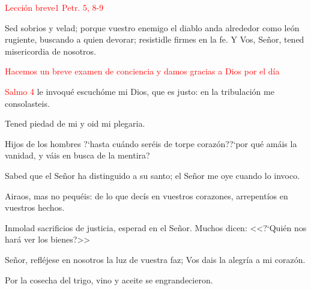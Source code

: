 \documentclass[9pt]{article}
\begin{document}
\begin{multicols}{2}
      \noindent\textcolor{red}{Lección breve}\hfill\textcolor{red}{1 Petr. 5, 8-9}
      
      Sed sobrios y velad; porque vuestro enemigo el diablo anda alrededor como león rugiente, buscando a quien devorar; resistidle firmes en la fe.
      Y Vos, Señor, tened misericordia de nosotros.

      \vspace{1mm}


      \begin{otherlanguage}{latin}
            
      \end{otherlanguage}

      \textcolor{red}{Hacemos un breve examen de conciencia y damos gracias a Dios por el día}

      \vspace{1mm}

      \begin{otherlanguage}{latin}
            
      \end{otherlanguage}

      \vspace{1mm}

      \hfill\textcolor{red}{Salmo 4}
      le invoqué escuchóme mi Dios, que es justo: en la tribulación me consolasteis.

      Tened piedad de mi y oid mi plegaria.

      Hijos de los hombres {?`}hasta cuándo seréis de torpe corazón?{?`}por qué amáis la vanidad, y váis en busca de la mentira?

      Sabed que el Señor ha distinguido a su santo; el Señor me oye cuando lo invoco.

      Airaos, mas no pequéis: de lo que decís en vuestros corazones, arrepentíos en vuestros hechos.
      
      Inmolad sacrificios de justicia, esperad en el Señor. Muchos dicen: <<{?`}Quién nos hará ver los bienes?>>

      Señor, refléjese en nosotros la luz de vuestra faz; Vos dais la alegría a mi corazón.

      Por la cosecha del trigo, vino y aceite se engrandecieron.


\end{multicols}
\end{document}

